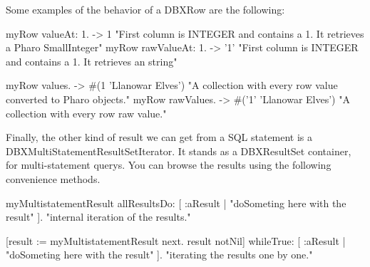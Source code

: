 \documentclass[a4paper,10pt,twoside]{book}
\begin{document}
Some examples of the behavior of a DBXRow are the following:
\begin{code}{}
myRow valueAt: 1. -> 1          "First column is INTEGER and contains a 1. It retrieves a Pharo SmallInteger"
myRow rawValueAt: 1. -> '1'     "First column is INTEGER and contains a 1. It retrieves an string"

myRow values.    -> #(1 'Llanowar Elves')   "A collection with every row value converted to Pharo objects."
myRow rawValues. -> #('1' 'Llanowar Elves') "A collection with every row raw value."
\end{code}


Finally, the other kind of result we can get from a SQL statement is a DBXMultiStatementResultSetIterator.  It stands as a DBXResultSet container, for multi-statement querys.  You can browse the results using the following convenience methods.

\begin{code}{}
myMultistatementResult allResultsDo: [ :aResult | "doSometing here with the result" ].  "internal iteration of the results."

[result := myMultistatementResult next. result notNil] 
    whileTrue: [ :aResult | "doSometing here with the result" ].  "iterating the results one by one."
\end{code}

\ifx\wholebook\relax\else
   
   
\end{document}
